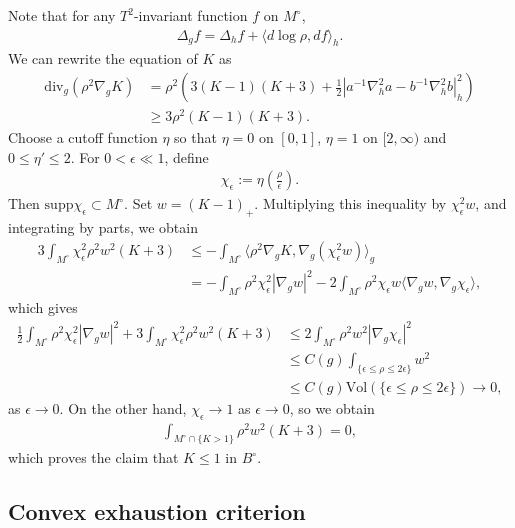 \documentclass[letterpaper]{amsart}
\theoremstyle{definition}
\theoremstyle{remark}
\begin{document}
Note that for any $T^2$-invariant function $f$ on $M ^{\circ}$,
\begin{align*}
	\Delta _g f = \Delta _h f + \langle d \log \rho , d f \rangle_h.
\end{align*} 
We can rewrite the equation of $K$ as
\begin{align*}
	\mathrm{div}_g( \rho ^2 \nabla _g K) &= \rho ^2 \left(  3 (K-1) (K+3)+ \frac{1}{2} \left| a ^{-1} \nabla ^2_h a - b ^{-1} \nabla ^2_h b \right|_h^2\right) \\
					     &\geq 3 \rho ^2 (K-1)(K+3).
\end{align*} 
Choose a cutoff function $\eta $ so that $\eta = 0$ on $[0,1]$, $\eta =1$ on $[2, \infty)$ and $0\leq \eta ' \leq 2$. For $0<\epsilon \ll 1$, define
\begin{align*}
	\chi _{\epsilon } := \eta \left( \frac{\rho }{\epsilon } \right) .
\end{align*} 
Then $\mathrm{supp} \chi _{\epsilon } \subset M ^{\circ}$.
Set $w= (K-1)_{+}$. Multiplying this inequality by $\chi _{\epsilon }^2 w$, and integrating by parts, we obtain
\begin{align*}
	3 \int_{M ^{\circ}} \chi _{\epsilon }^2 \rho ^2 w ^2 (K+3) &\leq - \int_{M ^{\circ}} \langle \rho ^2 \nabla _g K, \nabla_g (\chi _{\epsilon }^2 w) \rangle_g \\
	&= - \int_{M ^{\circ}} \rho ^2 \chi ^2_{\epsilon } |\nabla _g w|^2 - 2 \int_{M ^{\circ}} \rho ^2 \chi _{\epsilon } w \langle \nabla _g w, \nabla _g \chi _{\epsilon } \rangle,
\end{align*} 
which gives
\begin{align*}
		\frac{1}{2}\int_{M ^{\circ}} \rho ^2 \chi ^2_{\epsilon } |\nabla _g w|^2 + 3 \int_{M ^{\circ}} \chi _{\epsilon }^2 \rho ^2 w ^2 (K+3) &\leq 2 \int_{M ^{\circ}} \rho ^2 w ^2 |\nabla_g \chi _{\epsilon }|^2 \\
																		      &\leq C(g) \int_{\{\epsilon \leq \rho \leq 2 \epsilon \} } w ^2 \\
																		      &\leq C(g) \mathrm{Vol}( \{\epsilon \leq \rho \leq 2 \epsilon \} ) \to 0,
\end{align*} 
as $\epsilon \to 0$. On the other hand, $\chi _{\epsilon } \to 1$ as $\epsilon \to 0$, so we obtain
\begin{align*}
	\int_{M ^{\circ} \cap \{K> 1\} } \rho ^2 w ^2 (K+3) =0,
\end{align*} 
which proves the claim that $K \leq 1$ in $B ^{\circ}$.

\subsection{Convex exhaustion criterion}
\end{document}
